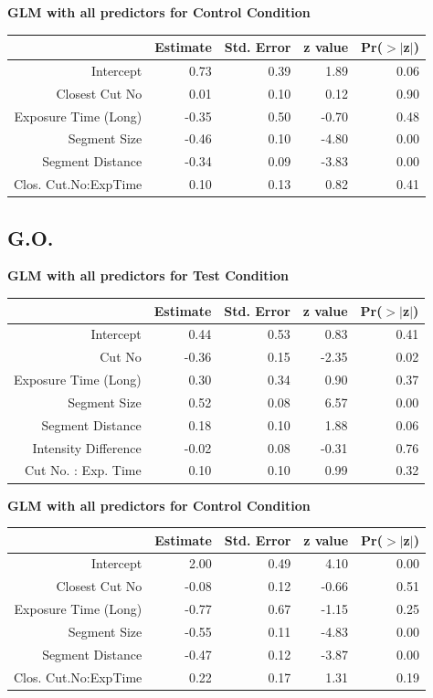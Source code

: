 \documentclass{article}
\begin{document}
\textbf{GLM with all predictors for Control Condition}
\begin{table}[ht]
\centering
\begin{tabular}{rrrrr}
  \hline
 & Estimate & Std. Error & z value & Pr($>$$|$z$|$) \\ 
  \hline
Intercept & 0.73 & 0.39 & 1.89 & 0.06 \\ 
  Closest Cut No & 0.01 & 0.10 & 0.12 & 0.90 \\ 
  Exposure Time (Long) & -0.35 & 0.50 & -0.70 & 0.48 \\ 
  Segment Size & -0.46 & 0.10 & -4.80 & 0.00 \\ 
  Segment Distance & -0.34 & 0.09 & -3.83 & 0.00 \\ 
  Clos. Cut.No:ExpTime & 0.10 & 0.13 & 0.82 & 0.41 \\ 
   \hline
\end{tabular}
\end{table}
\clearpage




\subsection*{G.O.}
\textbf{GLM with all predictors for Test Condition}
\begin{table}[ht]
\centering
\begin{tabular}{rrrrr}
  \hline
 & Estimate & Std. Error & z value & Pr($>$$|$z$|$) \\ 
  \hline
Intercept & 0.44 & 0.53 & 0.83 & 0.41 \\ 
  Cut No & -0.36 & 0.15 & -2.35 & 0.02 \\ 
  Exposure Time (Long) & 0.30 & 0.34 & 0.90 & 0.37 \\ 
  Segment Size & 0.52 & 0.08 & 6.57 & 0.00 \\ 
  Segment Distance & 0.18 & 0.10 & 1.88 & 0.06 \\ 
  Intensity Difference & -0.02 & 0.08 & -0.31 & 0.76 \\ 
  Cut No. : Exp. Time & 0.10 & 0.10 & 0.99 & 0.32 \\ 
   \hline
\end{tabular}
\end{table}

\textbf{GLM with all predictors for Control Condition}
\begin{table}[ht]
\centering
\begin{tabular}{rrrrr}
  \hline
 & Estimate & Std. Error & z value & Pr($>$$|$z$|$) \\ 
  \hline
Intercept & 2.00 & 0.49 & 4.10 & 0.00 \\ 
  Closest Cut No & -0.08 & 0.12 & -0.66 & 0.51 \\ 
  Exposure Time (Long) & -0.77 & 0.67 & -1.15 & 0.25 \\ 
  Segment Size & -0.55 & 0.11 & -4.83 & 0.00 \\ 
  Segment Distance & -0.47 & 0.12 & -3.87 & 0.00 \\ 
  Clos. Cut.No:ExpTime & 0.22 & 0.17 & 1.31 & 0.19 \\ 
   \hline
\end{tabular}
\end{table}
\clearpage
\end{document}
